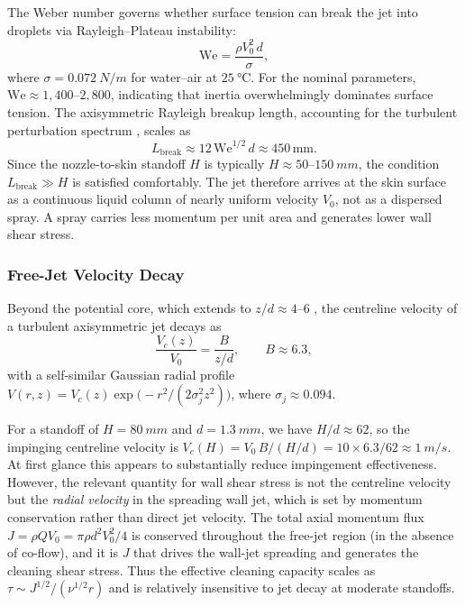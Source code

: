\documentclass[aps,prfluids,reprint,amsmath,amssymb,floatfix]{revtex4-2}
\newcommand{\We}{\mathrm{We}}
\begin{document}
The Weber number governs whether surface tension can break the jet into
droplets via Rayleigh--Plateau instability:
\begin{equation}
    \We = \frac{\rho V_0^2\,d}{\sigma},
    \label{eq:weber}
\end{equation}
where $\sigma = \SI{0.072}{N/m}$ for water--air at $\SI{25}{\celsius}$.
For the nominal parameters, $\We \approx 1{,}400$--$2{,}800$, indicating
that inertia overwhelmingly dominates surface tension. The axisymmetric
Rayleigh breakup length, accounting for the turbulent perturbation spectrum
\citep{Lefebvre1988}, scales as
\begin{equation}
    L_\mathrm{break} \approx 12\,\We^{1/2}\,d \approx 450\,\mathrm{mm}.
    \label{eq:breakup}
\end{equation}
Since the nozzle-to-skin standoff $H$ is typically $H \approx 50$--$\SI{150}{mm}$,
the condition $L_\mathrm{break} \gg H$ is satisfied comfortably. The jet
therefore arrives at the skin surface as a continuous liquid column of
nearly uniform velocity $V_0$, not as a dispersed spray. A spray carries
less momentum per unit area and generates lower wall shear stress.

\subsubsection{Free-Jet Velocity Decay}

Beyond the potential core, which extends to $z/d \approx 4$--$6$
\citep{PopeBook}, the centreline velocity of a turbulent axisymmetric jet
decays as
\begin{equation}
    \frac{V_c(z)}{V_0} = \frac{B}{z/d}, \qquad B \approx 6.3,
    \label{eq:jetdecay}
\end{equation}
with a self-similar Gaussian radial profile
$V(r,z) = V_c(z)\exp\!\bigl(-r^2/(2\sigma_j^2 z^2)\bigr)$,
where $\sigma_j \approx 0.094$.

For a standoff of $H = \SI{80}{mm}$ and $d = \SI{1.3}{mm}$, we have
$H/d \approx 62$, so the impinging centreline velocity is
$V_c(H) = V_0\,B/(H/d) = 10 \times 6.3/62 \approx \SI{1}{m/s}$.
At first glance this appears to substantially reduce impingement effectiveness.
However, the relevant quantity for wall shear stress is not the centreline
velocity but the \emph{radial velocity} in the spreading wall jet, which is
set by momentum conservation rather than direct jet velocity.
The total axial momentum flux $J = \rho Q V_0 = \pi \rho d^2 V_0^2 / 4$ is
conserved throughout the free-jet region (in the absence of co-flow), and
it is $J$ that drives the wall-jet spreading and generates the cleaning shear
stress. Thus the effective cleaning capacity scales as
$\tau \sim J^{1/2} / (\nu^{1/2} r)$ and is relatively insensitive to
jet decay at moderate standoffs.
\end{document}
